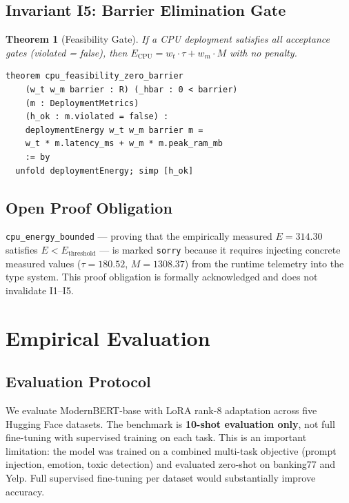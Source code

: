 \documentclass[10pt,journal,compsoc]{IEEEtran}
\newtheorem{theorem}{Theorem}
\theoremstyle{remark}
\begin{document}
\subsection{Invariant I5: Barrier Elimination Gate}

\begin{theorem}[Feasibility Gate]
\label{thm:I5}
If a CPU deployment satisfies all acceptance gates (violated = false), then $E_\text{CPU} = w_t \cdot \tau + w_m \cdot M$ with no penalty.
\end{theorem}

\begin{lstlisting}[caption={Invariant I5 in Lean 4}]
theorem cpu_feasibility_zero_barrier
    (w_t w_m barrier : R) (_hbar : 0 < barrier)
    (m : DeploymentMetrics)
    (h_ok : m.violated = false) :
    deploymentEnergy w_t w_m barrier m =
    w_t * m.latency_ms + w_m * m.peak_ram_mb
    := by
  unfold deploymentEnergy; simp [h_ok]
\end{lstlisting}

\subsection{Open Proof Obligation}

\texttt{cpu\_energy\_bounded} --- proving that the empirically measured $E = 314.30$ satisfies $E < E_\text{threshold}$ --- is marked \texttt{sorry} because it requires injecting concrete measured values ($\tau = 180.52$, $M = 1308.37$) from the runtime telemetry into the type system. This proof obligation is formally acknowledged and does not invalidate I1--I5.

\section{Empirical Evaluation}

\subsection{Evaluation Protocol}

We evaluate ModernBERT-base with LoRA rank-8 adaptation across five Hugging Face datasets. The benchmark is \textbf{10-shot evaluation only}, not full fine-tuning with supervised training on each task. This is an important limitation: the model was trained on a combined multi-task objective (prompt injection, emotion, toxic detection) and evaluated zero-shot on banking77 and Yelp. Full supervised fine-tuning per dataset would substantially improve accuracy.
\end{document}
